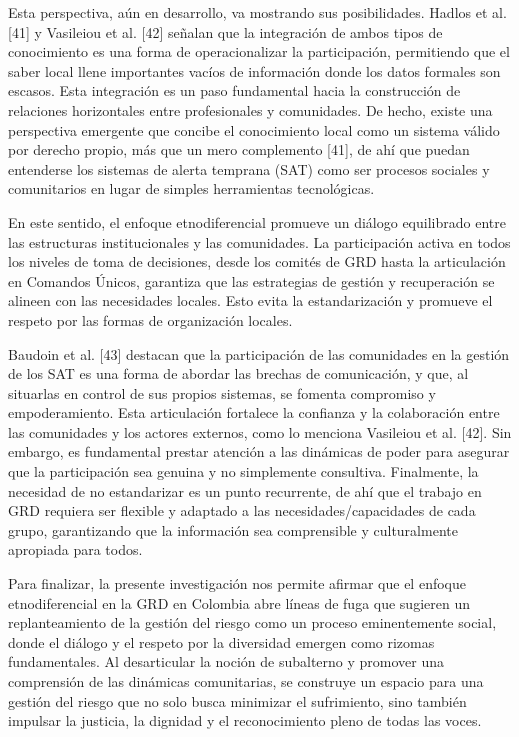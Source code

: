 \documentclass[
  spanish,
  letterpaper,
]{book}
\begin{document}
Esta perspectiva, aún en desarrollo, va mostrando sus posibilidades.
Hadlos et al. {[}41{]} y Vasileiou et al. {[}42{]} señalan que la
integración de ambos tipos de conocimiento es una forma de
operacionalizar la participación, permitiendo que el saber local llene
importantes vacíos de información donde los datos formales son escasos.
Esta integración es un paso fundamental hacia la construcción de
relaciones horizontales entre profesionales y comunidades. De hecho,
existe una perspectiva emergente que concibe el conocimiento local como
un sistema válido por derecho propio, más que un mero complemento
{[}41{]}, de ahí que puedan entenderse los sistemas de alerta temprana
(SAT) como ser procesos sociales y comunitarios en lugar de simples
herramientas tecnológicas.

En este sentido, el enfoque etnodiferencial promueve un diálogo
equilibrado entre las estructuras institucionales y las comunidades. La
participación activa en todos los niveles de toma de decisiones, desde
los comités de GRD hasta la articulación en Comandos Únicos, garantiza
que las estrategias de gestión y recuperación se alineen con las
necesidades locales. Esto evita la estandarización y promueve el respeto
por las formas de organización locales.

Baudoin et al. {[}43{]} destacan que la participación de las comunidades
en la gestión de los SAT es una forma de abordar las brechas de
comunicación, y que, al situarlas en control de sus propios sistemas, se
fomenta compromiso y empoderamiento. Esta articulación fortalece la
confianza y la colaboración entre las comunidades y los actores
externos, como lo menciona Vasileiou et al. {[}42{]}. Sin embargo, es
fundamental prestar atención a las dinámicas de poder para asegurar que
la participación sea genuina y no simplemente consultiva. Finalmente, la
necesidad de no estandarizar es un punto recurrente, de ahí que el
trabajo en GRD requiera ser flexible y adaptado a las
necesidades/capacidades de cada grupo, garantizando que la información
sea comprensible y culturalmente apropiada para todos.

Para finalizar, la presente investigación nos permite afirmar que el
enfoque etnodiferencial en la GRD en Colombia abre líneas de fuga que
sugieren un replanteamiento de la gestión del riesgo como un proceso
eminentemente social, donde el diálogo y el respeto por la diversidad
emergen como rizomas fundamentales. Al desarticular la noción de
subalterno y promover una comprensión de las dinámicas comunitarias, se
construye un espacio para una gestión del riesgo que no solo busca
minimizar el sufrimiento, sino también impulsar la justicia, la dignidad
y el reconocimiento pleno de todas las voces.
\end{document}
